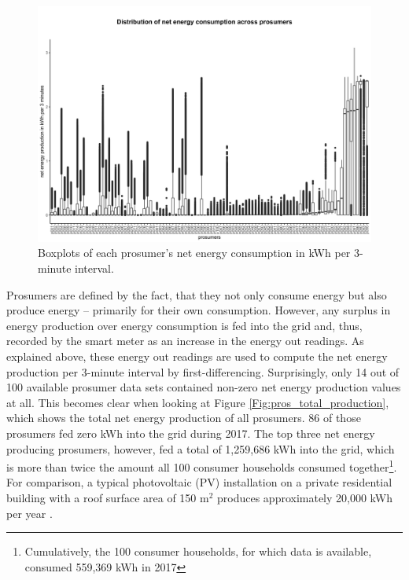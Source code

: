 \begin{figure}[htbp]
 \centering
\includegraphics[width=\textwidth]{thesis/graphs/prosumer_boxplots_consumption.jpg}
\caption[Boxplots of each prosumer's net energy consumption in kWh per 3-minute interval]{Boxplots of each prosumer's net energy consumption in kWh per 3-minute interval. \quantnet}
\label{Fig:pros_boxplots_consumption}
\end{figure}

Prosumers are defined by the fact, that they not only consume energy but also produce energy -- primarily for their own consumption. However, any surplus in energy production over energy consumption is fed into the grid and, thus, recorded by the smart meter as an increase in the energy out readings. As explained above, these energy out readings are used to compute the net energy production per 3-minute interval by first-differencing. Surprisingly, only 14 out of 100 available prosumer data sets contained non-zero net energy production values at all. This becomes clear when looking at Figure \ref{Fig:pros_total_production}, which shows the total net energy production of all prosumers. 86 of those prosumers fed zero kWh into the grid during 2017. The top three net energy producing prosumers, however, fed a total of 1,259,686 kWh into the grid, which is more than twice the amount all 100 consumer households consumed together\footnote{Cumulatively, the 100 consumer households, for which data is available, consumed 559,369 kWh in 2017}. For comparison, a typical photovoltaic (PV) installation on a private residential building with a roof surface area of 150 m$^2$ produces approximately 20,000 kWh per year \citep{energieatlas:2018}.

